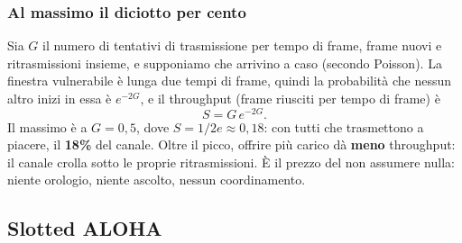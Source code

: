\subsubsection*{Al massimo il diciotto per cento}

Sia $G$ il numero di tentativi di trasmissione per tempo di frame, frame nuovi e ritrasmissioni insieme, e supponiamo che arrivino a
caso (secondo Poisson). La finestra vulnerabile è lunga due tempi di frame, quindi la probabilità che nessun altro inizi in essa è
$e^{-2G}$, e il throughput (frame riusciti per tempo di frame) è
$$S = G\,e^{-2G}.$$
Il massimo è a $G = 0{,}5$, dove $S = 1/2e \approx 0{,}18$: con tutti che trasmettono a piacere, il \textbf{18\%} del canale. Oltre il
picco, offrire più carico dà \textbf{meno} throughput: il canale crolla sotto le proprie ritrasmissioni. È il prezzo del non assumere
nulla: niente orologio, niente ascolto, nessun coordinamento.

\subsection{Slotted ALOHA}



